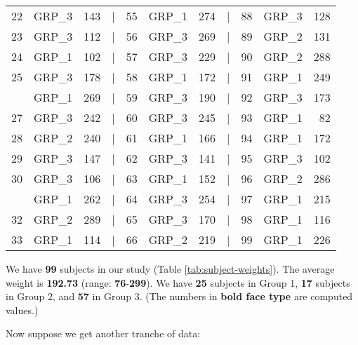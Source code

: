 \documentclass[smallextended]{svjour3}       %
\begin{document}
\begin{table}
\begin{tabular}[t]{rlrlrlrlrlr}
22 & GRP\_3 & 143 & | & 55 & GRP\_1 & 274 & | & 88 & GRP\_3 & 128\\
23 & GRP\_3 & 112 & | & 56 & GRP\_3 & 269 & | & 89 & GRP\_2 & 131\\
24 & GRP\_1 & 102 & | & 57 & GRP\_3 & 229 & | & 90 & GRP\_2 & 288\\
25 & GRP\_3 & 178 & | & 58 & GRP\_1 & 172 & | & 91 & GRP\_1 & 249\\
\addlinespace
26 & GRP\_1 & 269 & | & 59 & GRP\_3 & 190 & | & 92 & GRP\_3 & 173\\
27 & GRP\_3 & 242 & | & 60 & GRP\_3 & 245 & | & 93 & GRP\_1 & 82\\
28 & GRP\_2 & 240 & | & 61 & GRP\_1 & 166 & | & 94 & GRP\_1 & 172\\
29 & GRP\_3 & 147 & | & 62 & GRP\_3 & 141 & | & 95 & GRP\_3 & 102\\
30 & GRP\_3 & 106 & | & 63 & GRP\_1 & 152 & | & 96 & GRP\_2 & 286\\
\addlinespace
31 & GRP\_1 & 262 & | & 64 & GRP\_3 & 254 & | & 97 & GRP\_1 & 215\\
32 & GRP\_2 & 289 & | & 65 & GRP\_3 & 170 & | & 98 & GRP\_1 & 116\\
33 & GRP\_1 & 114 & | & 66 & GRP\_2 & 219 & | & 99 & GRP\_1 & 226\\
\bottomrule
\end{tabular}
\end{table}

We have \textbf{99} subjects in our study (Table \ref{tab:subject-weights}). The average weight is \textbf{192.73} (range: \textbf{76}-\textbf{299}). We have \textbf{25} subjects in Group 1, \textbf{17} subjects in Group 2, and \textbf{57} in Group 3. (The numbers in \textbf{bold face type} are computed values.)

Now suppose we get another tranche of data:
\end{document}
